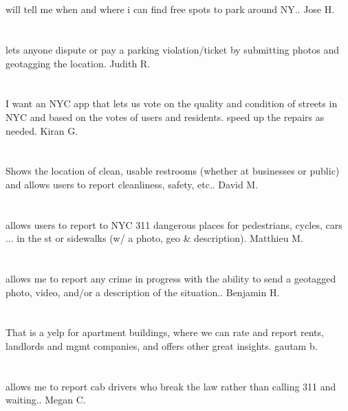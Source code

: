 \section{}will tell me when and where i can find free spots to park around NY.. Jose H.
\section{}lets anyone dispute or pay a parking violation/ticket by submitting photos and geotagging the location. Judith R.
\section{} I want an NYC app that lets us vote on the quality and condition of streets in NYC and based on the votes of users and residents.  speed up the repairs as needed.  Kiran G.
\section{}Shows the location of clean,  usable restrooms (whether at businesses or public) and allows users to report cleanliness,  safety,  etc.. David M.
\section{}allows users to report to NYC 311 dangerous places for pedestrians,  cycles,  cars ... in the st or sidewalks (w/ a photo,  geo \& description). Matthieu M.
\section{} allows me to report any crime in progress with the ability to send a geotagged photo,  video,  and/or a description of the situation.. Benjamin H.
\section{}That is a yelp for apartment buildings,  where we can rate and report rents,  landlords and mgmt companies,  and offers other great insights. gautam b.
\section{}allows me to report cab drivers who break the law rather than calling 311 and waiting.. Megan C.
